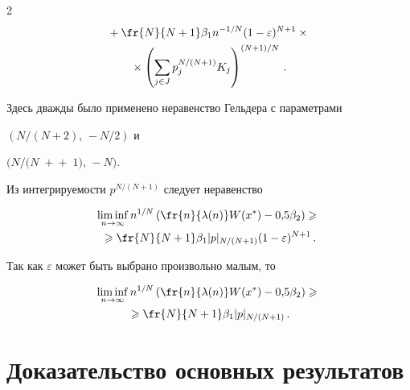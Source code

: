 \begin{multicols}{2}
\begin{multline*}
{}


+\fr{N}{N+1}\beta_1 n^{-1/N}(1-\varepsilon)^{N+1}\times{}\\


{}\times \left( \suml{j\in


J}{}p_j^{N/(N+1)}K_j\right)^{(N+1)/N}\,.


\end{multline*}


Здесь дважды было применено неравенство Гельдера с параметрами


$(N/(N+2),\,-N/2)$ и


$(N/(N\;+{}$\linebreak ${}+\;1),\,-N)$.





Из интегрируемости $p^{N/(N+1)}$ следует неравенство


\begin{multline*}


\limi{n\rightarrow


\infty}n^{1/N}\left(\fr{n}{\lambda(n)}W(x^*)-0{,}5\beta_2\right)\geqslant{}\\


{}\geqslant


\fr{N}{N+1} \beta_1 |p|_{N/(N+1)}(1-\varepsilon)^{N+1}\,.


\end{multline*}





Так как $\varepsilon$ может быть выбрано произвольно малым, то


\begin{multline*}


\limi{n\rightarrow


\infty}n^{1/N}\left(\fr{n}{\lambda(n)}W(x^*)-0{,}5\beta_2\right)\geqslant{}\\


{}\geqslant


\fr{N}{N+1} \beta_1 |p|_{N/(N+1)}\,.


\end{multline*}





\section{Доказательство основных результатов}






\end{multicols}
